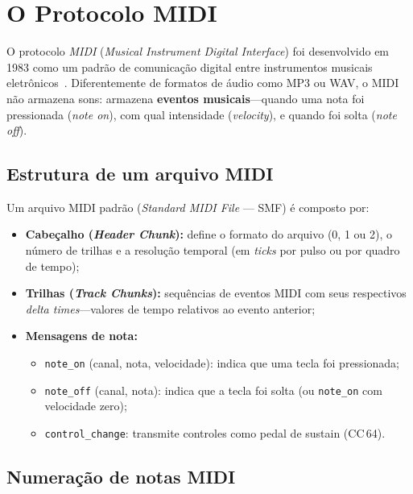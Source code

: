 \documentclass[
  12pt,
  openright,
  twoside,
  a4paper,
  english,
  brazil
]{abntex2}
\begin{document}
\section{O Protocolo MIDI}

O protocolo \textit{MIDI} (\textit{Musical Instrument Digital Interface})
foi desenvolvido em 1983 como um padrão de comunicação digital entre
instrumentos musicais eletrônicos~\cite{midi1996}. Diferentemente de
formatos de áudio como MP3 ou WAV, o MIDI não armazena sons: armazena
\textbf{eventos musicais}---quando uma nota foi pressionada (\textit{note
on}), com qual intensidade (\textit{velocity}), e quando foi solta
(\textit{note off}).

\subsection{Estrutura de um arquivo MIDI}

Um arquivo MIDI padrão (\textit{Standard MIDI File} --- SMF) é composto
por:

\begin{itemize}
  \item \textbf{Cabeçalho (\textit{Header Chunk}):} define o formato do
        arquivo (0, 1 ou 2), o número de trilhas e a resolução temporal
        (em \textit{ticks} por pulso ou por quadro de tempo);
  \item \textbf{Trilhas (\textit{Track Chunks}):} sequências de eventos
        MIDI com seus respectivos \textit{delta times}---valores de tempo
        relativos ao evento anterior;
  \item \textbf{Mensagens de nota:}
        \begin{itemize}
          \item \texttt{note\_on} (canal, nota, velocidade): indica que
                uma tecla foi pressionada;
          \item \texttt{note\_off} (canal, nota): indica que a tecla foi
                solta (ou \texttt{note\_on} com velocidade zero);
          \item \texttt{control\_change}: transmite controles como pedal
                de sustain (CC\,64).
        \end{itemize}
\end{itemize}

\subsection{Numeração de notas MIDI}
\end{document}
